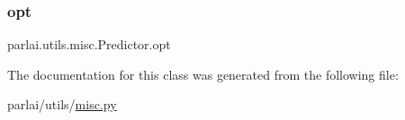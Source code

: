 \mbox{\label{classparlai_1_1utils_1_1misc_1_1Predictor_a608b3d7f6722389f3a7eeed0ec5772b7}} 
\subsubsection{\texorpdfstring{opt}{opt}}
{\footnotesize\ttfamily parlai.\+utils.\+misc.\+Predictor.\+opt}



The documentation for this class was generated from the following file\+:\begin{DoxyCompactItemize}
\item 
parlai/utils/\hyperlink{misc_8py}{misc.\+py}\end{DoxyCompactItemize}
